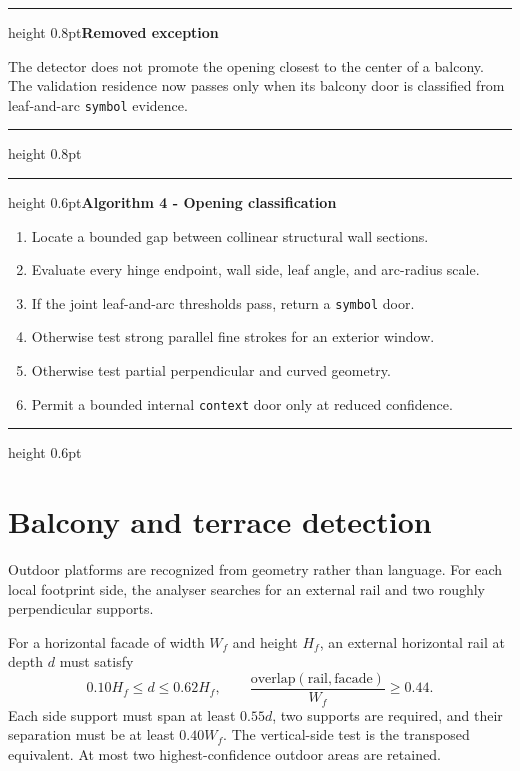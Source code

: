 \documentclass[11pt,a4paper]{article}
\newcommand{\code}[1]{\texttt{#1}}
\newenvironment{keybox}[1]{
  \par\medskip\noindent\begin{minipage}{\textwidth}
  \color{Blue}\hrule height 0.8pt\vspace{1.6mm}\textbf{#1}\par\smallskip\color{Ink}
}{
  \vspace{1.3mm}\color{Blue}\hrule height 0.8pt\end{minipage}\par\medskip
}
\newenvironment{algorithmblock}[1]{
  \par\medskip\noindent\begin{minipage}{\textwidth}
  \color{Ink!55}\hrule height 0.6pt\vspace{1.4mm}\textbf{#1}\par\smallskip\color{Ink}
}{
  \vspace{1.2mm}\color{Ink!55}\hrule height 0.6pt\end{minipage}\par\medskip
}
\begin{document}
\begin{keybox}{Removed exception}
The detector does not promote the opening closest to the center of a balcony. The validation residence now passes only when its balcony door is classified from leaf-and-arc \code{symbol} evidence.
\end{keybox}

\begin{algorithmblock}{Algorithm 4 - Opening classification}
\begin{enumerate}
  \item Locate a bounded gap between collinear structural wall sections.
  \item Evaluate every hinge endpoint, wall side, leaf angle, and arc-radius scale.
  \item If the joint leaf-and-arc thresholds pass, return a \code{symbol} door.
  \item Otherwise test strong parallel fine strokes for an exterior window.
  \item Otherwise test partial perpendicular and curved geometry.
  \item Permit a bounded internal \code{context} door only at reduced confidence.
\end{enumerate}
\end{algorithmblock}

\section{Balcony and terrace detection}

Outdoor platforms are recognized from geometry rather than language. For each local footprint side, the analyser searches for an external rail and two roughly perpendicular supports.

For a horizontal facade of width $W_f$ and height $H_f$, an external horizontal rail at depth $d$ must satisfy
\begin{equation}
0.10H_f\leq d\leq0.62H_f,
\qquad
\frac{\text{overlap}(\text{rail},\text{facade})}{W_f}\geq0.44.
\end{equation}
Each side support must span at least $0.55d$, two supports are required, and their separation must be at least $0.40W_f$. The vertical-side test is the transposed equivalent. At most two highest-confidence outdoor areas are retained.
\end{document}
